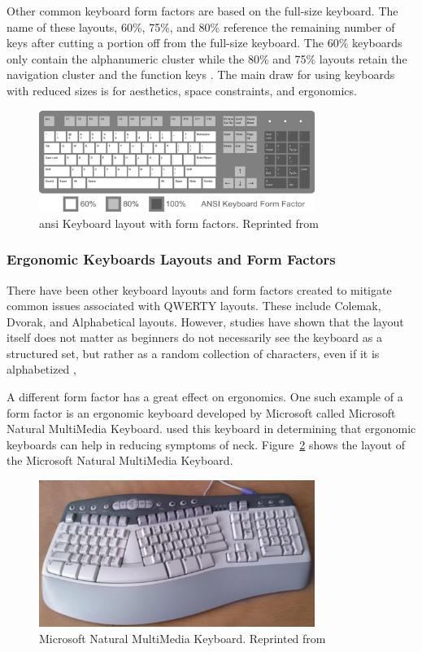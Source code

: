 \documentclass{report}
\begin{document}
Other common keyboard form factors are based on the full-size keyboard. The name
of these layouts, 60\%, 75\%, and 80\% reference the remaining number of keys
after cutting a portion off from the full-size keyboard. The 60\% keyboards only
contain the alphanumeric cluster while the 80\% and 75\% layouts retain the
navigation cluster and the function keys \parencite{parkkinen2018}. The main
draw for using keyboards with reduced sizes is for aesthetics, space
constraints, and ergonomics.

\begin{figure}[H]
	\centering
	\includegraphics[width=0.8\textwidth]{ansi.png}
	\caption{\ac{ansi} Keyboard layout with form factors. Reprinted from }
	\label{fig:ansi}
	\centering
\end{figure}

\subsubsection{Ergonomic Keyboards Layouts and Form Factors}

There have been other keyboard layouts and form factors created to mitigate
common issues associated with QWERTY layouts. These include Colemak, Dvorak, and
Alphabetical layouts. However, studies have shown that the layout itself does
not matter as beginners do not necessarily see the keyboard as a structured set,
but rather as a random collection of characters, even if it is alphabetized
\parencite{norman1982},

A different form factor has a great effect on ergonomics. One such example of a
form factor is an ergonomic keyboard developed by Microsoft called Microsoft
Natural MultiMedia Keyboard. \citeauthor{ripat2010} used this keyboard in
determining that ergonomic keyboards can help in reducing symptoms of \ac{neck}.
Figure~\ref{fig:mn} shows the layout of the Microsoft Natural MultiMedia
Keyboard.

\begin{figure}[H]
	\centering
	\includegraphics[width=0.8\textwidth]{mn.png}
	\caption{Microsoft Natural MultiMedia Keyboard. Reprinted from }
	\label{fig:mn}
	\centering
\end{figure}
\end{document}
